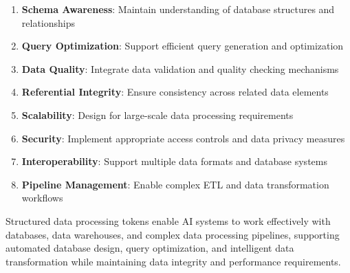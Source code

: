 \begin{enumerate}
\item \textbf{Schema Awareness}: Maintain understanding of database structures and relationships
\item \textbf{Query Optimization}: Support efficient query generation and optimization
\item \textbf{Data Quality}: Integrate data validation and quality checking mechanisms
\item \textbf{Referential Integrity}: Ensure consistency across related data elements
\item \textbf{Scalability}: Design for large-scale data processing requirements
\item \textbf{Security}: Implement appropriate access controls and data privacy measures
\item \textbf{Interoperability}: Support multiple data formats and database systems
\item \textbf{Pipeline Management}: Enable complex ETL and data transformation workflows
\end{enumerate}
\begin{comment}
Feedback: This list is good but very high-level. To make it more actionable:
1.  **Schema Awareness**: "Always serialize the database schema and prepend it to the input sequence for any query generation task. Use distinct special tokens for tables, columns, primary keys, and foreign keys to give the model a clear understanding of the database structure."
2.  **Referential Integrity**: "When generating data manipulation statements (INSERT, UPDATE), use special tokens to represent foreign key relationships. This can guide the model to generate values that are consistent with the linked tables."
3.  **Security**: "For text-to-SQL models, implement a post-processing validation step that uses a parser to check the generated SQL against a set of security rules (e.g., disallowing `DROP TABLE` commands) before execution. Never execute generated SQL without validation."
\end{comment}

Structured data processing tokens enable AI systems to work effectively with databases, data warehouses, and complex data processing pipelines, supporting automated database design, query optimization, and intelligent data transformation while maintaining data integrity and performance requirements.
